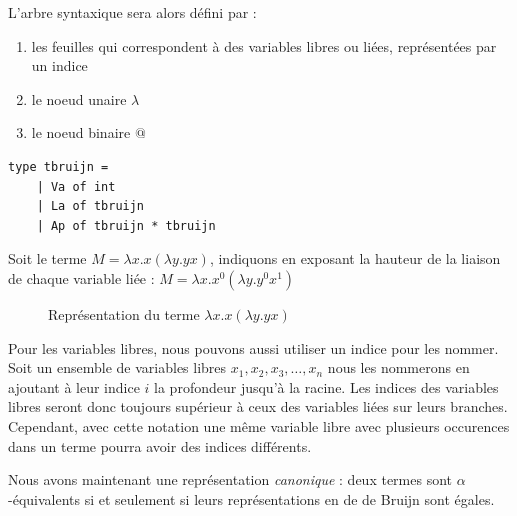 \documentclass[11pt]{book}
\begin{document}
L'arbre syntaxique sera alors défini par :
\begin{enumerate}
	\item les feuilles qui correspondent à des variables libres ou liées, représentées par un indice
	\item le noeud unaire $\lambda$
	\item le noeud binaire $@$
\end{enumerate}

\begin{Verbatim}
type tbruijn =
	| Va of int
	| La of tbruijn 
	| Ap of tbruijn * tbruijn
\end{Verbatim}
	
Soit le terme $M=\lambda x.x(\lambda y. yx)$, indiquons en exposant la hauteur de la liaison
de chaque variable liée : $M=\lambda x.x^0(\lambda y. y^0x^1)$
\begin{figure}[H]
\centering
\caption{Représentation du terme $\lambda x.x(\lambda y. yx)$}
\end{figure}

Pour les variables libres, nous pouvons aussi utiliser un indice pour les nommer.
Soit un ensemble de variables libres ${x_1, x_2, x_3,\dots, x_n}$ nous les nommerons en ajoutant 
à leur indice $i$ la profondeur jusqu'à la racine. Les indices des variables libres seront
 donc toujours supérieur à ceux des variables liées sur leurs branches. Cependant, avec cette notation une
 même variable libre avec plusieurs occurences dans un terme pourra avoir des indices différents.

 Nous avons maintenant une représentation \textit{canonique} : deux termes sont $\alpha$-équivalents
 si et seulement si leurs représentations en de de Bruijn sont égales.
\end{document}
